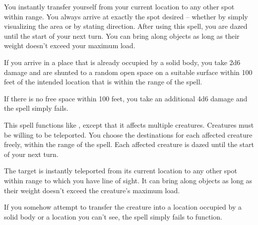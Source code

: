 \spellrng{\rngext}
\begin{spelleffect}
  You instantly transfer yourself from your current location to any other spot within range. You always arrive at exactly the spot desired -- whether by simply visualizing the area or by stating direction. After using this spell, you are dazed until the start of your next turn. You can bring along objects as long as their weight doesn't exceed your maximum load.
\end{spelleffect}
\begin{spellnotes}
  \par If you arrive in a place that is already occupied by a solid body, you take 2d6 damage and are shunted to a random open space on a suitable surface within 100 feet of the intended location that is within the range of the spell.
  \par  If there is no free space within 100 feet, you take an additional 4d6 damage and the spell simply fails.
\end{spellnotes}

\begin{spelleffect}
  This spell functions like , except that it affects multiple creatures. Creatures must be willing to be teleported. You choose the destinations for each affected creature freely, within the range of the spell. Each affected creature is dazed until the start of your next turn.
\end{spelleffect}

\spellrng{\rngclose}
\begin{spelleffect}
    The target is instantly teleported from its current location to any other spot within range to which you have line of sight. It can bring along objects as long as their weight doesn't exceed the creature's maximum load.
\end{spelleffect}
\begin{spellnotes}
    If you somehow attempt to transfer the creature into a location occupied by a solid body or a location you can't see, the spell simply fails to function.
\end{spellnotes}

